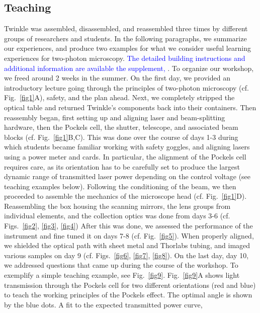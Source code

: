 \documentclass[10pt,letterpaper]{article}
\begin{document}
\subsection*{Teaching}
Twinkle was assembled, disassembled, and reassembled three times by different groups of researchers and students. In the following paragraphs, we summarize our experiences, and produce two examples for what we consider useful learning experiences for two-photon microscopy. \textcolor{blue}{The detailed building instructions and additional information are available the supplement, }.\newline
To organize our workshop, we freed around 2 weeks in the summer. On the first day, we provided an introductory lecture going through the principles of two-photon microscopy (cf. Fig.~\ref{fig1}A), safety, and the plan ahead. Next, we completely stripped the optical table and returned Twinkle's components back into their containers. Then reassembly began, first setting up and aligning laser and beam-splitting hardware, then the Pockels cell, the shutter, telescope, and associated beam blocks (cf. Fig.~\ref{fig1}B,C). This was done over the course of days 1-3 during which students became familiar working with safety goggles, and aligning lasers using a power meter and cards. In particular, the alignment of the Pockels cell requires care, as its orientation has to be carefully set to produce the largest dynamic range of transmitted laser power depending on the control voltage (see teaching examples below). Following the conditioning of the beam, we then proceeded to assemble the mechanics of the microscope head (cf. Fig.~\ref{fig1}D). Reassembling the box housing the scanning mirrors, the lens groups from individual elements, and the collection optics was done from days 3-6 (cf. Figs.~\ref{fig2}, \ref{fig3}, \ref{fig4}) After this was done, we assessed the performance of the instrument and fine tuned it on days 7-8 (cf. Fig.~\ref{fig5}). When properly aligned, we shielded the optical path with sheet metal and Thorlabs tubing, and imaged various samples on day 9 (cf. Figs.~\ref{fig6}, \ref{fig7}, \ref{fig8}). On the last day, day 10, we addressed questions that came up during the course of the workshop.\newline
To exemplify a simple teaching example, see Fig.~\ref{fig9}. Fig.~\ref{fig9}A shows light transmission through the Pockels cell for two different orientations (red and blue) to teach the working principles of the Pockels effect. The optimal angle is shown by the blue dots. A fit to the expected transmitted power curve, 
\end{document}
